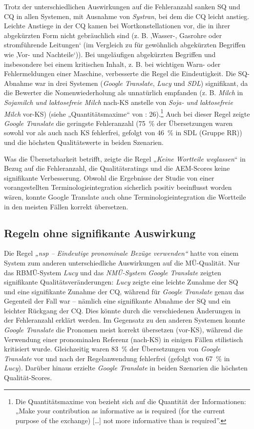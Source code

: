 Trotz der unterschiedlichen Auswirkungen auf die Fehleranzahl sanken SQ und CQ in allen Systemen, mit Ausnahme von \textit{Systran}, bei dem die CQ leicht anstieg. Leichte Anstiege in der CQ kamen bei Wortkonstellationen vor, die in ihrer abgekürzten Form nicht gebräuchlich sind (z. B. ‚Wasser-, Gasrohre oder stromführende Leitungen‘ (im Vergleich zu für gewöhnlich abgekürzten Begriffen wie ‚Vor- und Nachteile‘)). Bei ungeläufigen abgekürzten Begriffen und insbesondere bei einem kritischen Inhalt, z. B. bei wichtigen Warn- oder Fehlermeldungen einer Maschine, verbesserte die Regel die Eindeutigkeit. Die SQ-Abnahme war in drei Systemen (\textit{Google Translate}, \textit{Lucy} und \textit{SDL}) signifikant, da die Bewerter die Nomenwiederholung als unnatürlich empfanden (z. B. \textit{Milch} in \textit{Sojamilch und laktosefreie Milch} nach-KS anstelle von \textit{Soja- und laktosefreie Milch} vor-KS) (siehe „Quantitätsmaxime“ von \citealt{Grice1975}: 26).\footnote{\textrm{Die Quantitätsmaxime von \citet[26]{Grice1975} bezieht sich auf die Quantität der Informationen: „Make your contribution as informative as is required (for the current purpose of the exchange) […] not more informative than is required”.} } Auch bei dieser Regel zeigte \textit{Google Translate} die geringste Fehleranzahl (75~\% der Übersetzungen waren sowohl vor als auch nach KS fehlerfrei, gefolgt von 46~\% in SDL (Gruppe RR)) und die höchsten Qualitätswerte in beiden Szenarien.

Was die Übersetzbarkeit betrifft, zeigte die Regel „\textit{Keine Wortteile weglassen}“ in Bezug auf die Fehleranzahl, die Qualitätsratings und die AEM-Scores keine signifikante Verbesserung. Obwohl die Ergebnisse der Studie von einer vorangestellten Terminologieintegration sicherlich positiv beeinflusst worden wären, konnte Google Translate auch ohne Terminologieintegration die Wortteile in den meisten Fällen korrekt übersetzen.

\subsection{Regeln ohne signifikante Auswirkung}

Die Regel \textit{„nsp -- Eindeutige pronominale Bezüge verwenden“} hatte von einem System zum anderen unterschiedliche Auswirkungen auf die MÜ-Qualität. Nur das RBMÜ-System \textit{Lucy} und das \textit{NMÜ-System Google Translate} zeigten signifikante Qualitätsveränderungen: \textit{Lucy} zeigte eine leichte Zunahme der SQ und eine signifikante Zunahme der CQ, während für \textit{Google Translate} genau das Gegenteil der Fall war -- nämlich eine signifikante Abnahme der SQ und ein leichter Rückgang der CQ. Dies könnte durch die verschiedenen Änderungen in der Fehleranzahl erklärt werden. Im Gegensatz zu den anderen Systemen konnte \textit{Google Translate} die Pronomen meist korrekt übersetzen (vor-KS), während die Verwendung einer pronominalen Referenz (nach-KS) in einigen Fällen stilistisch kritisiert wurde. Gleichzeitig waren 83~\% der Übersetzungen von \textit{Google Translate} vor und nach der Regelanwendung fehlerfrei (gefolgt von 67~\% in \textit{Lucy}). Darüber hinaus erzielte \textit{Google Translate} in beiden Szenarien die höchsten Qualität-Scores.

